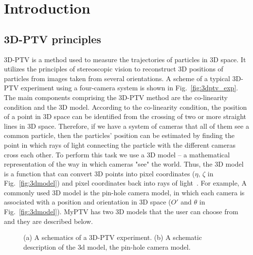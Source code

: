 \documentclass[10pt,a4paper]{article}
\begin{document}
\section{Introduction}

\subsection{3D-PTV principles}


3D-PTV is a method used to measure the trajectories of particles in 3D space. It utilizes the principles of stereoscopic vision to reconstruct 3D positions of particles from images taken from several orientations. A scheme of a typical 3D-PTV experiment using a four-camera system is shown in Fig.~\ref{fig:3dptv_exp}. The main components comprising the 3D-PTV method are the co-linearity condition and the 3D model. According to the co-linearity condition, the position of a point in 3D space can be identified from the crossing of two or more straight lines in 3D space. Therefore, if we have a system of cameras that all of them see a common particle, then the particles' position can be estimated by finding the point in which rays of light connecting the particle with the different cameras cross each other. To perform this task we use a 3D model -- a mathematical representation of the way in which cameras "see" the world. Thus, the 3D model is a function that can convert 3D points into pixel coordinates ($\eta,\, \zeta$ in Fig.~\ref{fig:3dmodel}) and pixel coordinates back into rays of light~\cite{Virant1997, Maas1993}.
For example, A commonly used 3D model is the pin-hole camera model, in which each camera is associated with a position and orientation in 3D space ($O'$ and $\theta$ in Fig.~\ref{fig:3dmodel}). MyPTV has two 3D models that the user can choose from and they are described below.


\begin{figure}[!ht]
	\centering
	\hfill
	\caption{(a) A schematics of a 3D-PTV experiment. (b) A schematic description of the 3d model, the pin-hole camera model.}
\end{figure}
\end{document}
